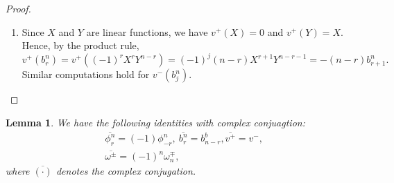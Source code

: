 \documentclass[11pt, a4paper]{amsart}
\theoremstyle{plain}
\newtheorem{lemma}[theorem]{Lemma}
\theoremstyle{definition}
\numberwithin{equation}{section}
\begin{document}
\begin{proof}
\begin{enumerate}
\begin{align*}
                  & = \frac{n -r + 2}{2}(z_2 - z_2^{\prime})w_{2}^{-(\frac{n - (r-2)}{2})}{w_{2}^{\prime}}^{-(\frac{n + (r-2)}{2})} \\
                  & = \frac{n -r + 2}{2} \phi^{n}_{r - 2}. 
              \end{align*}
              The computation of $v^{-}\phi^{n}_{r}$ is similar. 
        \item Since $X$ and $Y$ are linear functions, we have $v^{+}(X) = 0$ and $v^{+}(Y) = X$. 
              Hence, by the product rule, 
              \begin{equation*}
                  v^{+}(b^{n}_{r}) = v^{+}((-1)^{r}X^{r}Y^{n-r}) = (-1)^{j}(n - r) X^{r + 1} Y^{n - r - 1} = -(n - r) b^{n}_{r + 1}. 
              \end{equation*}
              Similar computations hold for $v^{-}(b^{n}_{j})$. 
        \end{enumerate}
\end{proof}

\begin{lemma}
        We have the following identities with complex conjuagtion: 
        \begin{align*}
           &  \overline{\phi^{n}_{r}} =  (-1)\phi^{n}_{-r}, \ \overline{b^n_r} = b^b_{n - r}, \overline{v^{+}} = v^{-}, \\
           &  \overline{\omega^{\pm}} =  (-1)^{n}\omega_{n}^{\mp},  
        \end{align*}
        where $\overline{(\cdot)}$ denotes the complex conjugation. 
\end{lemma}
\end{document}
